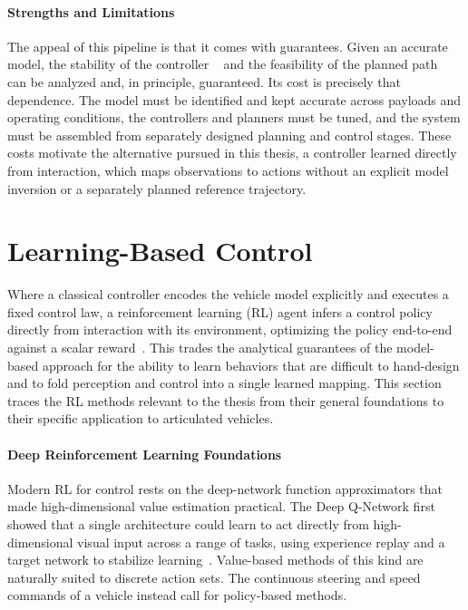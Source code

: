 \paragraph{Strengths and Limitations}
The appeal of this pipeline is that it comes with guarantees. Given an accurate model, the stability of the controller ~\cite{mayne2000constrained, samson1995chained} and the feasibility of the planned path ~\cite{lavalle2006planning, karaman2011sampling} can be analyzed and, in principle, guaranteed. Its cost is precisely that dependence. The model must be identified and kept accurate across payloads and operating conditions, the controllers and planners must be tuned, and the system must be assembled from separately designed planning and control stages. These costs motivate the alternative pursued in this thesis, a controller learned directly from interaction, which maps observations to actions without an explicit model inversion or a separately planned reference trajectory.

\section{Learning-Based Control}

Where a classical controller encodes the vehicle model explicitly and executes a fixed control law, a reinforcement learning (RL) agent infers a control policy directly from interaction with its environment, optimizing the policy end-to-end against a scalar reward~\cite{sutton2018rl}. This trades the analytical guarantees of the model-based approach for the ability to learn behaviors that are difficult to hand-design and to fold perception and control into a single learned mapping. This section traces the RL methods relevant to the thesis from their general foundations to their specific application to articulated vehicles.

\paragraph{Deep Reinforcement Learning Foundations}
Modern RL for control rests on the deep-network function approximators that made high-dimensional value estimation practical. The Deep Q-Network first showed that a single architecture could learn to act directly from high-dimensional visual input across a range of tasks, using experience replay and a target network to stabilize learning~\cite{mnih2015dqn}. Value-based methods of this kind are naturally suited to discrete action sets. The continuous steering and speed commands of a vehicle instead call for policy-based methods.

